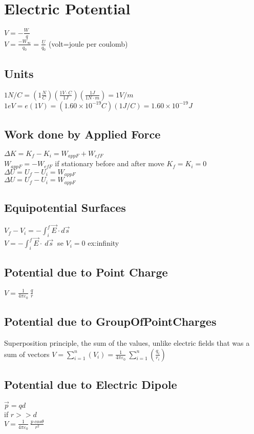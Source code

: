 \section{Electric Potential}
$V=-\frac{W_{\:}}{q}$\\
$V=\frac{-W_{\infty }}{q_0}=\frac{U}{q_0}$ (volt=joule per coulomb)\\
\subsection{Units}
$1N/C=\left(1\frac{N}{C}\right)\left(\frac{1V\cdot C}{1J}\right)\left(\frac{1J}{1N\cdot m}\right)=1V/m$\\
$1eV=e\left(1 V\right)=\left(1.60\times 10^{-19} C\right)\left(1 J/C\right)=1.60\times 10^{-19}J$\\
\subsection{Work done by Applied Force}
$\Delta K=K_f-K_i=W_{appF}+W_{efF}$\\
$W_{appF}=-W_{efF}$ if stationary before and after move $K_f=K_i=0$\\
$\Delta U=U_f-U_i=W_{appF}$\\
$\Delta U=U_f-U_i=W_{appF}$\\
\subsection{Equipotential Surfaces}
$V_f-V_i=-\int _i^f\vec{E}\cdot d\vec{s}\:$\\
$V=-\int _i^f\vec{E}\cdot \:d\vec{s}\:$ se $V_i = 0$ ex:infinity\\
\subsection{Potential due to Point Charge}
$V=\frac{1}{4\pi \varepsilon _0}\:\frac{q}{r}$\\
\subsection{Potential due to GroupOfPointCharges}
Superposition principle, the sum of the values, unlike electric fields that was a sum of vectors
$V=\sum _{i=1}^n\left(V_i\right)=\frac{1}{4\pi \varepsilon _0}\:\sum _{i=1}^n\left(\frac{q_i}{r_i}\right)$\\
\subsection{Potential due to Electric Dipole}
$\vec{p}=qd$\\
if $r>>d$\\
$V=\frac{1}{4\pi \varepsilon _0}\:\frac{p\:cos\theta }{r^2}$\\
